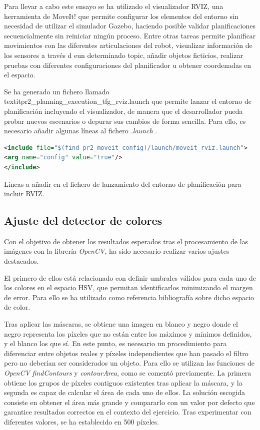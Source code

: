 \documentclass[12pt,spanish,chapterprefix, numbers=noenddot]{book}
\numberwithin{equation}{section}
\numberwithin{figure}{section}
\begin{document}
Para llevar a cabo este ensayo se ha utilizado el visualizador RVIZ, una herramienta de MoveIt! que permite configurar los elementos del entorno sin necesidad de utilizar el simulador Gazebo, haciendo posible validar planificaciones secuencialmente sin reiniciar ningún proceso. Entre otras tareas permite planificar movimientos con las diferentes articulaciones del robot, visualizar información de los sensores a través d eun determinado topic, añadir objetos ficticios, realizar pruebas con diferentes configuraciones del planificador u obtener coordenadas en el espacio. 

Se ha generado un fichero llamado textit{pr2\_planning\_execution\_tfg\_rviz.launch} que permite lanzar el entorno de planificación incluyendo el visualizador, de manera que el desarrollador pueda probar nuevos escenarios o depurar sus cambios de forma sencilla. Para ello, es necesario añadir algunas líneas al fichero \textit{.launch} \cite{planning_rviz}.  %
\vspace{20pt}
\begin{algorithm}[htb!]
	\begin{lstlisting}[breaklines=true,language=xml] 
<include file="$(find pr2_moveit_config)/launch/moveit_rviz.launch">
<arg name="config" value="true"/>
</include>
	\end{lstlisting}
\caption{\label{alg:planning_rviz}Líneas a añadir en el fichero de lanzamiento del entorno de planificación para incluir RVIZ.}
\end{algorithm}

\subsection{Ajuste del detector de colores}

Con el objetivo de obtener los resultados esperados tras el procesamiento de las imágenes con la librería \textit{OpenCV}, ha sido necesario realizar varios ajustes destacados.

El primero de ellos está relacionado con definir umbrales válidos para cada uno de los colores en el espacio HSV, que permitan identificarlos minimizando el margen de error. Para ello se ha utilizado como referencia bibliografía \cite{colores} \cite{py_colors} sobre dicho espacio de color.

Tras aplicar las máscaras, se obtiene una imagen en blanco y negro donde el negro representa los píxeles que no están entre los máximos y mínimos definidos, y el blanco los que sí. En este punto, es necesario un procedimiento para diferenciar entre objetos reales y píxeles independientes que han pasado el filtro pero no deberían ser considerados un objeto. Para ello se utilizan las funciones de \textit{OpenCV} \textit{findContours} y \textit{contourArea}, como se comentó previamente. La primera obtiene los grupos de píxeles contiguos existentes tras aplicar la máscara, y la segunda es capaz de calcular el área de cada uno de ellos. La solución escogida consiste en obtener el área más grande y compararlo con un valor por defecto que garantice resultados correctos en el contexto del ejercicio. Tras experimentar con diferentes valores, se ha establecido en 500 píxeles. 
\end{document}
